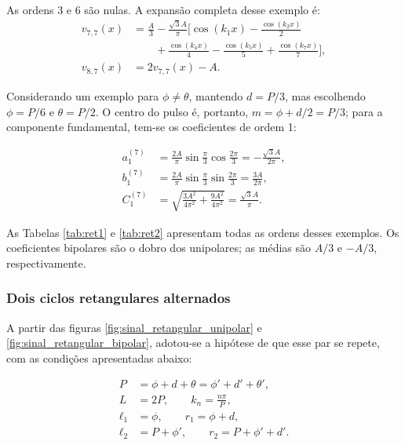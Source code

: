 As ordens 3 e 6 são nulas. A expansão completa desse exemplo é:
\begin{equation}
    \begin{aligned}
        v_{7,7}(x)&=\frac{A}{3}-\frac{\sqrt{3}A}{\pi}\biggl[
            \cos(k_1x)-\frac{\cos(k_2x)}{2} \\
            &\qquad {}+\frac{\cos(k_4x)}{4}
            -\frac{\cos(k_5x)}{5}+\frac{\cos(k_7x)}{7}\biggr], \\
        v_{8,7}(x)&=2v_{7,7}(x)-A.
    \end{aligned}
\end{equation}

Considerando um exemplo para $\phi\neq\theta$, mantendo $d=P/3$, mas escolhendo $\phi=P/6$ e
$\theta=P/2$. O centro do pulso é, portanto, $m=\phi+d/2=P/3$;
para a componente fundamental, tem-se os coeficientes de ordem 1:

\begin{equation}
    \begin{aligned}
        a_1^{(7)}&=\frac{2A}{\pi}\sin\frac{\pi}{3}\cos\frac{2\pi}{3}
            =-\frac{\sqrt{3}A}{2\pi}, \\
        b_1^{(7)}&=\frac{2A}{\pi}\sin\frac{\pi}{3}\sin\frac{2\pi}{3}
            =\frac{3A}{2\pi}, \\
        C_1^{(7)}&=\sqrt{\frac{3A^2}{4\pi^2}+\frac{9A^2}{4\pi^2}}
            =\frac{\sqrt{3}A}{\pi}.
    \end{aligned}
\end{equation}

As Tabelas \ref{tab:ret1} e \ref{tab:ret2} apresentam todas as ordens
desses exemplos. Os coeficientes bipolares são o dobro dos unipolares;
as médias são $A/3$ e $-A/3$, respectivamente.



\subsubsection{Dois ciclos retangulares alternados}
A partir das figuras \ref{fig:sinal_retangular_unipolar} e \ref{fig:sinal_retangular_bipolar}, adotou-se a hipótese de que esse par se repete, com as condições apresentadas abaixo:

\begin{equation}
    \begin{aligned}
        P&=\phi+d+\theta=\phi'+d'+\theta', \\
        L&=2P, \qquad k_n=\frac{n\pi}{P}, \\
        \ell_1&=\phi, \qquad r_1=\phi+d, \\
        \ell_2&=P+\phi', \qquad r_2=P+\phi'+d'.
    \end{aligned}
\end{equation}

